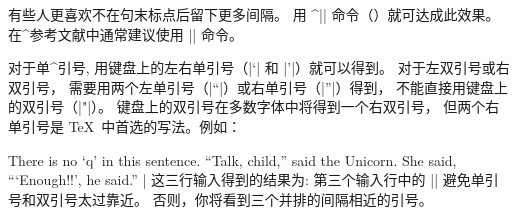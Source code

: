 {%
有些人更喜欢不在句末标点后留下更多间隔。
用 ^|\frenchspacing| 命令（\xref\frenchspacing ）就可达成此效果。
在^{参考文献}中通常建议使用 |\frenchspacing| 命令。

对于单^{引号}, 用键盘上的左右单引号（|`| 和 |'|）就可以得到。
对于左双引号或右双引号，
需要用两个左单引号（|``|）或右单引号（|''|）得到，
不能直接用键盘上的双引号（|"|）。
键盘上的双引号在多数字体中将得到一个右双引号，
但两个右单引号是 \TeX\ 中首选的写法。例如：

\vbox{%
\csdisplay
There is no `q' in this sentence.
``Talk, child,'' said the Unicorn.
She said, ``\thinspace`Enough!!', he said.''
|
}%
这三行输入得到的结果为:
\noindent
第三个输入行中的 |\thinspace| 避免单引号和双引号太过靠近。
否则，你将看到三个并排的间隔相近的引号。

}
